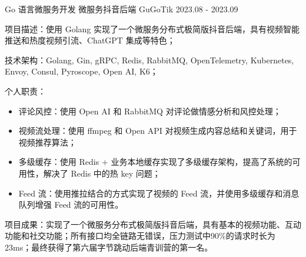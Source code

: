 

\begin{cventries}

  \cventry
    {Go 语言微服务开发} %
    {微服务抖音后端 GuGoTik} %
    {2023.08 - 2023.09} %
    {} %
    {
      \begin{cvitems} %
        \item {项目描述：使用 Golang 实现了一个微服务分布式极简版抖音后端，具有视频智能推送和热度视频引流、ChatGPT 集成等特色；}
        \item {技术架构：Golang, Gin, gRPC, Redis, RabbitMQ, OpenTelemetry, Kubernetes, Envoy, Consul, Pyroscope, Open AI, K6；}
        \item {个人职责：}
          \begin{itemize}
            \item {评论风控：使用 Open AI 和 RabbitMQ 对评论做情感分析和风控处理；}
            \item {视频流处理：使用 ffmpeg 和 Open API 对视频生成内容总结和关键词，用于视频推荐算法；}
            \item {多级缓存：使用 Redis + 业务本地缓存实现了多级缓存架构，提高了系统的可用性，解决了 Redis 中的热 key 问题；}
            \item {Feed 流：使用推拉结合的方式实现了视频的 Feed 流，并使用多级缓存和消息队列增强 Feed 流的可用性。}
          \end{itemize}
        \item {项目成果：实现了一个微服务分布式极简版抖音后端，具有基本的视频功能、互动功能和社交功能；所有接口均全链路无错误，压力测试中90\%的请求时长为 23ms；最终获得了第六届字节跳动后端青训营的第一名。}
      \end{cvitems}
    }


\end{cventries}
